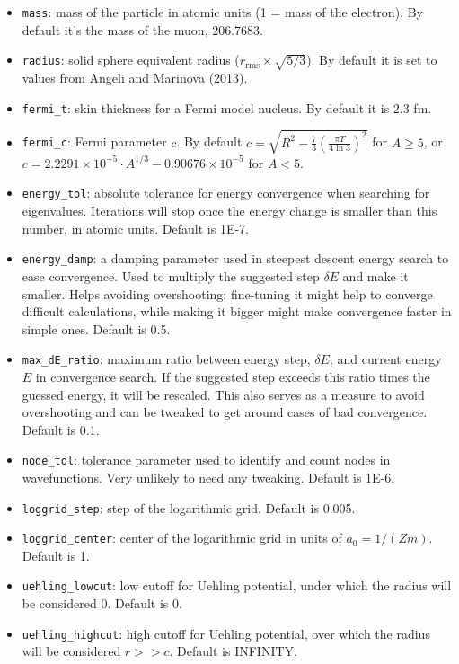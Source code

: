 \documentclass[]{article}
\begin{document}
\begin{itemize}
	\item \texttt{mass}: mass of the particle in atomic units (1 = mass of the electron). By default it's the mass of the muon, 206.7683.
	\item \texttt{radius}: solid sphere equivalent radius ($r_\text{rms} \times \sqrt{5/3}$). By default it is set to values from Angeli and Marinova (2013).
	\item \texttt{fermi\_t}: skin thickness for a Fermi model nucleus. By default it is 2.3 fm.
	\item \texttt{fermi\_c}: Fermi parameter $c$. By default $c = \sqrt{R^2 - \frac{7}{3}\left(\frac{\pi T}{4\ln 3}\right)^2}$ for $A \geq 5$, or $c = 2.2291 \times 10^{-5} \cdot A^{1/3} - 0.90676 \times 10^{-5}$ for $A < 5$.
	\item \texttt{energy\_tol}: absolute tolerance for energy convergence when searching for eigenvalues. Iterations will stop once the energy change is smaller than this number, in atomic units. Default is 1E-7.
	\item \texttt{energy\_damp}: a damping parameter used in steepest descent energy search to ease convergence. Used to multiply the suggested step $\delta E$ and make it smaller. Helps avoiding overshooting; fine-tuning it might help to converge difficult calculations, while making it bigger might make convergence faster in simple ones. Default is 0.5.
	\item \texttt{max\_dE\_ratio}: maximum ratio between energy step, $\delta E$, and current energy $E$ in convergence search. If the suggested step exceeds this ratio times the guessed energy, it will be rescaled. This also serves as a measure to avoid overshooting and can be tweaked to get around cases of bad convergence. Default is 0.1.
	\item \texttt{node\_tol}: tolerance parameter used to identify and count nodes in wavefunctions. Very unlikely to need any tweaking. Default is 1E-6.
	\item \texttt{loggrid\_step}: step of the logarithmic grid. Default is 0.005.
	\item \texttt{loggrid\_center}: center of the logarithmic grid in units of $a_0 = 1/(Zm)$. Default is 1.
	\item \texttt{uehling\_lowcut}: low cutoff for Uehling potential, under which the radius will be considered 0. Default is 0.
	\item \texttt{uehling\_highcut}: high cutoff for Uehling potential, over which the radius will be considered $r >> c$. Default is INFINITY.

\end{itemize}
\end{document}
